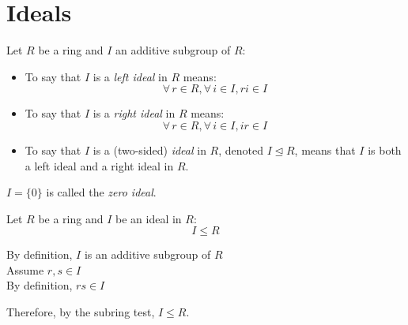 \documentclass[letterpaper,12pt,fleqn]{article}
\newcommand{\ide}{\trianglelefteq}
\begin{document}
\section*{Ideals}

\begin{definition}
  Let $R$ be a ring and $I$ an additive subgroup of $R$:
  \begin{itemize}
  \item To say that $I$ is a \emph{left ideal} in $R$ means:
    \[\forall\,r\in R,\forall\,i\in I,ri\in I\]
  \item To say that $I$ is a \emph{right ideal} in $R$ means:
    \[\forall\,r\in R,\forall\,i\in I,ir\in I\]
  \item To say that $I$ is a (two-sided) \emph{ideal} in $R$, denoted $I\ide R$, means
    that $I$ is both a left ideal and a right ideal in $R$.
  \end{itemize}
\end{definition}

\begin{definition}
  $I=\{0\}$ is called the \emph{zero ideal}.
\end{definition}    

\begin{theorem}
  Let $R$ be a ring and $I$ be an ideal in $R$:
  \[I\le R\]
\end{theorem}

\begin{theproof}
  By definition, $I$ is an additive subgroup of $R$ \\
  Assume $r,s\in I$ \\
  By definition, $rs\in I$

  Therefore, by the subring test, $I\le R$.
\end{theproof}
\end{document}
